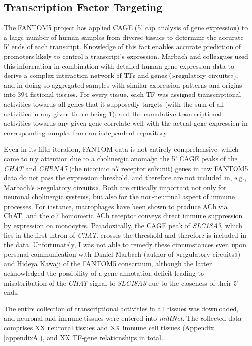 \subsection{Transcription Factor Targeting} \label{database:TF}
The FANTOM5 project has applied CAGE (5' cap analysis of gene expression) to a large number of human samples from diverse tissues to determine the accurate 5' ends of each transcript\cite{Hon2017}. Knowledge of this fact enables accurate prediction of promoters likely to control a transcript's expression. Marbach and colleagues used this information in combination with detailed human gene expression data to derive a complex interaction network of TFs and genes (»regulatory circuits«), and in doing so aggregated samples with similar expression patterns and origins into 394 fictional tissues\cite{Marbach2016}. For every tissue, each TF was assigned transcriptional activities towards all genes that it supposedly targets (with the sum of all activities in any given tissue being 1); and the cumulative transcriptional activities towards any given gene correlate well with the actual gene expression in corresponding samples from an independent repository.

Even in its fifth iteration, FANTOM data is not entirely comprehensive, which came to my attention due to a cholinergic anomaly: the 5' CAGE peaks of the \textit{CHAT} and \textit{CHRNA7} (the nicotinic $\alpha$7 receptor subunit) genes in raw FANTOM5 data do not pass the expression threshold, and therefore are not included in, e.g., Marbach's »regulatory circuits«. Both are critically important not only for neuronal cholinergic systems, but also for the non-neuronal aspect of immune processes. For instance, macrophages have been shown to produce ACh via ChAT\cite{}, and the $\alpha$7 homomeric ACh receptor conveys direct immune suppression by expression on monocytes\cite{}. Paradoxically, the CAGE peak of \textit{SLC18A3}, which lies in the first intron of \textit{CHAT}, crosses the threshold and therefore is included in the data. Unfortunately, I was not able to remedy these circumstances even upon personal communication with Daniel Marbach (author of »regulatory circuits«) and Hideya Kawaji of the FANTOM5 consortium, although the latter acknowledged the possibility of a gene annotation deficit leading to misattribution of the \textit{CHAT} signal to \textit{SLC18A3} due to the closeness of their 5' ends.

The entire collection of transcriptional activities in all tissues was downloaded\cite{Marbach2016}, and neuronal and immune tissues were entered into \textit{miRNet}. The collected data comprises XX neuronal tissues and XX immune cell tissues (Appendix \ref{appendixA}), and XX TF-gene relationships in total. 

